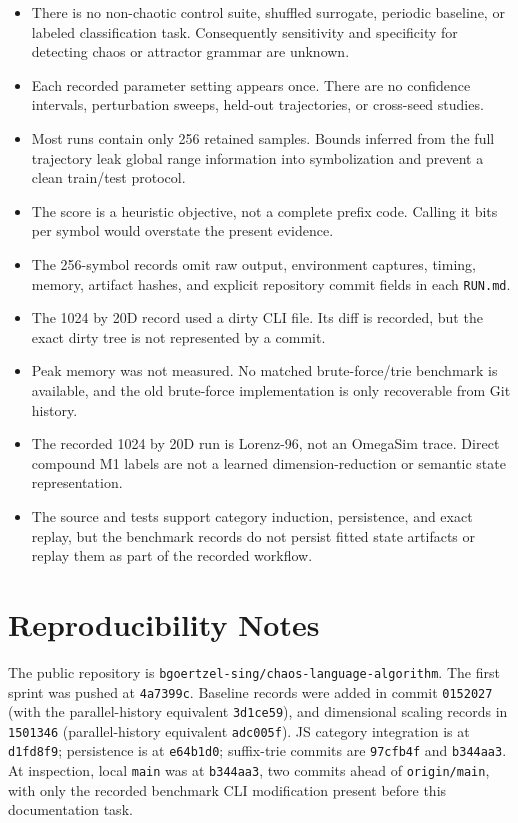 \documentclass[11pt]{article}
\begin{document}
\begin{itemize}
  \item There is no non-chaotic control suite, shuffled surrogate, periodic
  baseline, or labeled classification task. Consequently sensitivity and
  specificity for detecting chaos or attractor grammar are unknown.
  \item Each recorded parameter setting appears once. There are no confidence
  intervals, perturbation sweeps, held-out trajectories, or cross-seed studies.
  \item Most runs contain only 256 retained samples. Bounds inferred from the
  full trajectory leak global range information into symbolization and prevent
  a clean train/test protocol.
  \item The score is a heuristic objective, not a complete prefix code. Calling
  it bits per symbol would overstate the present evidence.
  \item The 256-symbol records omit raw output, environment captures, timing,
  memory, artifact hashes, and explicit repository commit fields in each
  \texttt{RUN.md}.
  \item The 1024 by 20D record used a dirty CLI file. Its diff is recorded, but
  the exact dirty tree is not represented by a commit.
  \item Peak memory was not measured. No matched brute-force/trie benchmark is
  available, and the old brute-force implementation is only recoverable from
  Git history.
  \item The recorded 1024 by 20D run is Lorenz-96, not an OmegaSim trace. Direct
  compound M1 labels are not a learned dimension-reduction or semantic state
  representation.
  \item The source and tests support category induction, persistence, and exact
  replay, but the benchmark records do not persist fitted state artifacts or
  replay them as part of the recorded workflow.
\end{itemize}

\section{Reproducibility Notes}

The public repository is \texttt{bgoertzel-sing/chaos-language-algorithm}.
The first sprint was pushed at \texttt{4a7399c}. Baseline records were added in commit
\texttt{0152027} (with the parallel-history equivalent \texttt{3d1ce59}), and
dimensional scaling records in \texttt{1501346} (parallel-history equivalent
\texttt{adc005f}). JS category integration is at \texttt{d1fd8f9}; persistence
is at \texttt{e64b1d0}; suffix-trie commits are \texttt{97cfb4f} and
\texttt{b344aa3}. At inspection, local \texttt{main} was at \texttt{b344aa3},
two commits ahead of \texttt{origin/main}, with only the recorded benchmark CLI
modification present before this documentation task.
\end{document}
